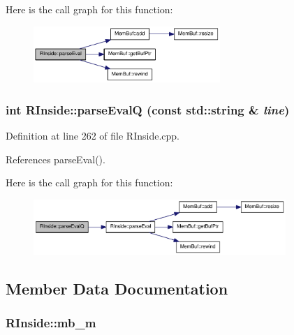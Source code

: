 Here is the call graph for this function:\nopagebreak
\begin{figure}[H]
\begin{center}
\leavevmode
\includegraphics[width=200pt]{classRInside_a4cf10e78fb73bfda699f921c28e6b985_cgraph}
\end{center}
\end{figure}
\hypertarget{classRInside_a9f18dc5011e1e32a52360b3d88f9bab7}{
\subsubsection[{parseEvalQ}]{\setlength{\rightskip}{0pt plus 5cm}int RInside::parseEvalQ (const std::string \& {\em line})}}
\label{classRInside_a9f18dc5011e1e32a52360b3d88f9bab7}


Definition at line 262 of file RInside.cpp.

References parseEval().

Here is the call graph for this function:\nopagebreak
\begin{figure}[H]
\begin{center}
\leavevmode
\includegraphics[width=271pt]{classRInside_a9f18dc5011e1e32a52360b3d88f9bab7_cgraph}
\end{center}
\end{figure}


\subsection{Member Data Documentation}
\hypertarget{classRInside_ad078e52002a242f7f5c94211ca3dd8be}{
\subsubsection[{mb\_\-m}]{ {\bf RInside::mb\_\-m}}}
\label{classRInside_ad078e52002a242f7f5c94211ca3dd8be}


